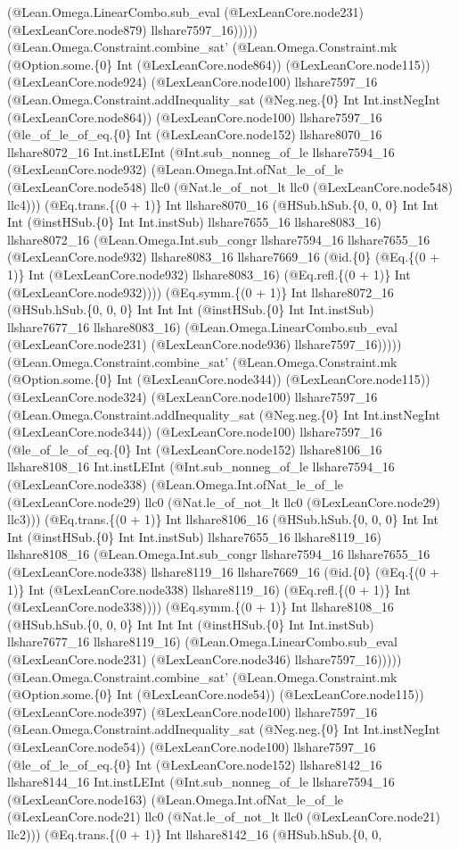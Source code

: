 \documentclass[11pt]{article}
\begin{document}
(@Lean.Omega.LinearCombo.sub\_eval (@LexLeanCore.node231) (@LexLeanCore.node879) llshare7597\_16))))) (@Lean.Omega.Constraint.combine\_sat' (@Lean.Omega.Constraint.mk (@Option.some.\{0\} Int (@LexLeanCore.node864)) (@LexLeanCore.node115)) (@LexLeanCore.node924) (@LexLeanCore.node100) llshare7597\_16 (@Lean.Omega.Constraint.addInequality\_sat (@Neg.neg.\{0\} Int Int.instNegInt (@LexLeanCore.node864)) (@LexLeanCore.node100) llshare7597\_16 (@le\_of\_le\_of\_eq.\{0\} Int (@LexLeanCore.node152) llshare8070\_16 llshare8072\_16 Int.instLEInt (@Int.sub\_nonneg\_of\_le llshare7594\_16 (@LexLeanCore.node932) (@Lean.Omega.Int.ofNat\_le\_of\_le (@LexLeanCore.node548) llc0 (@Nat.le\_of\_not\_lt llc0 (@LexLeanCore.node548) llc4))) (@Eq.trans.\{(0 + 1)\} Int llshare8070\_16 (@HSub.hSub.\{0, 0, 0\} Int Int Int (@instHSub.\{0\} Int Int.instSub) llshare7655\_16 llshare8083\_16) llshare8072\_16 (@Lean.Omega.Int.sub\_congr llshare7594\_16 llshare7655\_16 (@LexLeanCore.node932) llshare8083\_16 llshare7669\_16 (@id.\{0\} (@Eq.\{(0 + 1)\} Int (@LexLeanCore.node932) llshare8083\_16) (@Eq.refl.\{(0 + 1)\} Int (@LexLeanCore.node932)))) (@Eq.symm.\{(0 + 1)\} Int llshare8072\_16 (@HSub.hSub.\{0, 0, 0\} Int Int Int (@instHSub.\{0\} Int Int.instSub) llshare7677\_16 llshare8083\_16) (@Lean.Omega.LinearCombo.sub\_eval (@LexLeanCore.node231) (@LexLeanCore.node936) llshare7597\_16))))) (@Lean.Omega.Constraint.combine\_sat' (@Lean.Omega.Constraint.mk (@Option.some.\{0\} Int (@LexLeanCore.node344)) (@LexLeanCore.node115)) (@LexLeanCore.node324) (@LexLeanCore.node100) llshare7597\_16 (@Lean.Omega.Constraint.addInequality\_sat (@Neg.neg.\{0\} Int Int.instNegInt (@LexLeanCore.node344)) (@LexLeanCore.node100) llshare7597\_16 (@le\_of\_le\_of\_eq.\{0\} Int (@LexLeanCore.node152) llshare8106\_16 llshare8108\_16 Int.instLEInt (@Int.sub\_nonneg\_of\_le llshare7594\_16 (@LexLeanCore.node338) (@Lean.Omega.Int.ofNat\_le\_of\_le (@LexLeanCore.node29) llc0 (@Nat.le\_of\_not\_lt llc0 (@LexLeanCore.node29) llc3))) (@Eq.trans.\{(0 + 1)\} Int llshare8106\_16 (@HSub.hSub.\{0, 0, 0\} Int Int Int (@instHSub.\{0\} Int Int.instSub) llshare7655\_16 llshare8119\_16) llshare8108\_16 (@Lean.Omega.Int.sub\_congr llshare7594\_16 llshare7655\_16 (@LexLeanCore.node338) llshare8119\_16 llshare7669\_16 (@id.\{0\} (@Eq.\{(0 + 1)\} Int (@LexLeanCore.node338) llshare8119\_16) (@Eq.refl.\{(0 + 1)\} Int (@LexLeanCore.node338)))) (@Eq.symm.\{(0 + 1)\} Int llshare8108\_16 (@HSub.hSub.\{0, 0, 0\} Int Int Int (@instHSub.\{0\} Int Int.instSub) llshare7677\_16 llshare8119\_16) (@Lean.Omega.LinearCombo.sub\_eval (@LexLeanCore.node231) (@LexLeanCore.node346) llshare7597\_16))))) (@Lean.Omega.Constraint.combine\_sat' (@Lean.Omega.Constraint.mk (@Option.some.\{0\} Int (@LexLeanCore.node54)) (@LexLeanCore.node115)) (@LexLeanCore.node397) (@LexLeanCore.node100) llshare7597\_16 (@Lean.Omega.Constraint.addInequality\_sat (@Neg.neg.\{0\} Int Int.instNegInt (@LexLeanCore.node54)) (@LexLeanCore.node100) llshare7597\_16 (@le\_of\_le\_of\_eq.\{0\} Int (@LexLeanCore.node152) llshare8142\_16 llshare8144\_16 Int.instLEInt (@Int.sub\_nonneg\_of\_le llshare7594\_16 (@LexLeanCore.node163) (@Lean.Omega.Int.ofNat\_le\_of\_le (@LexLeanCore.node21) llc0 (@Nat.le\_of\_not\_lt llc0 (@LexLeanCore.node21) llc2))) (@Eq.trans.\{(0 + 1)\} Int llshare8142\_16 (@HSub.hSub.\{0, 0, 
\end{document}
